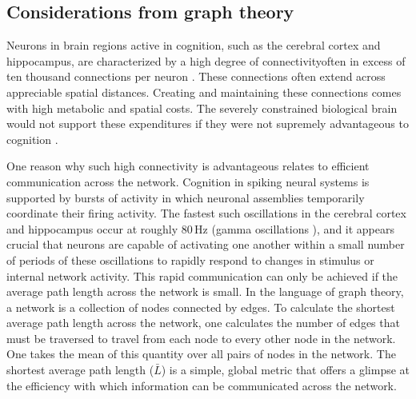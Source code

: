 \documentclass[twocolumn]{article}
\begin{document}
\subsection{Considerations from graph theory}
Neurons in brain regions active in cognition, such as the cerebral cortex and hippocampus, are characterized by a high degree of connectivity\textemdash often in excess of ten thousand connections per neuron \cite{brsc1998,bu2006}. These connections often extend across appreciable spatial distances. Creating and maintaining these connections comes with high metabolic and spatial costs. The severely constrained biological brain would not support these expenditures if they were not supremely advantageous to cognition \cite{busp2012}.

One reason why such high connectivity is advantageous relates to efficient communication across the network. Cognition in spiking neural systems is supported by bursts of activity in which neuronal assemblies temporarily coordinate their firing activity. The fastest such oscillations in the cerebral cortex and hippocampus occur at roughly 80\,Hz (gamma oscillations \cite{bu2006}), and it appears crucial that neurons are capable of activating one another within a small number of periods of these oscillations to rapidly respond to changes in stimulus or internal network activity. This rapid communication can only be achieved if the average path length across the network is small. In the language of graph theory, a network is a collection of nodes connected by edges. To calculate the shortest average path length across the network, one calculates the number of edges that must be traversed to travel from each node to every other node in the network. One takes the mean of this quantity over all pairs of nodes in the network. The shortest average path length ($\bar{L}$) is a simple, global metric that offers a glimpse at the efficiency with which information can be communicated across the network.
\end{document}
